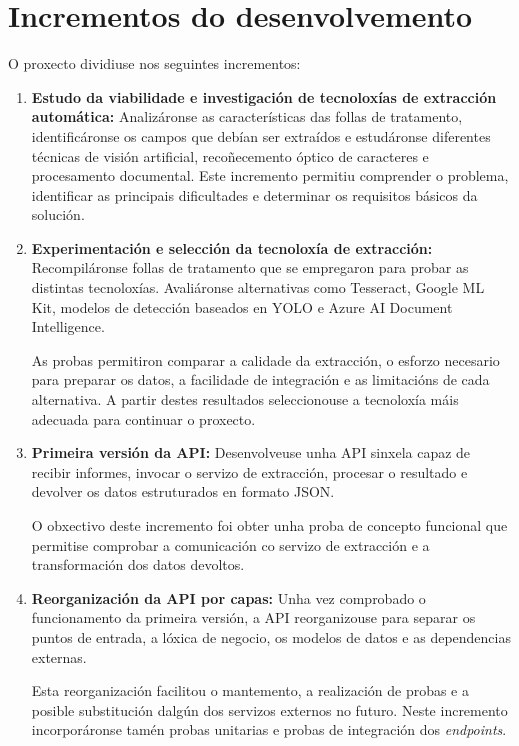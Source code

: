 \section{Incrementos do desenvolvemento}
O proxecto dividiuse nos seguintes incrementos:
\begin{enumerate}
    \item \textbf{Estudo da viabilidade e investigación de tecnoloxías de extracción automática:} Analizáronse as características das follas de tratamento, identificáronse os campos que debían ser extraídos e estudáronse  diferentes técnicas de visión artificial, recoñecemento óptico de caracteres e procesamento documental.
    Este incremento permitiu comprender o problema, identificar as principais dificultades e determinar os requisitos básicos da solución.

    \item \textbf{Experimentación e selección da tecnoloxía de extracción:}  Recompiláronse follas de tratamento que se empregaron para probar as distintas tecnoloxías. Avaliáronse alternativas como Tesseract, Google ML Kit, modelos de detección baseados en YOLO e Azure AI Document Intelligence.

     As probas permitiron comparar a calidade da extracción, o esforzo necesario para preparar os datos, a facilidade de integración e as limitacións de cada alternativa. A partir destes resultados seleccionouse a tecnoloxía máis adecuada para continuar o proxecto.

    \item \textbf{Primeira versión da API:} Desenvolveuse unha API sinxela capaz de recibir informes, invocar o servizo de extracción, procesar o resultado e devolver os datos estruturados en formato JSON.

    O obxectivo deste incremento foi obter unha proba de concepto funcional que permitise comprobar a comunicación co servizo de extracción e a transformación dos datos devoltos.

    \item \textbf{Reorganización da API por capas:} Unha vez comprobado o funcionamento da primeira versión, a API reorganizouse para separar os puntos de entrada, a lóxica de negocio, os modelos de datos e as dependencias externas. 

    Esta reorganización facilitou o mantemento, a realización de probas e a posible substitución dalgún dos servizos externos no futuro. Neste incremento incorporáronse tamén probas unitarias e probas de integración dos \textit{endpoints}.


\end{enumerate}
